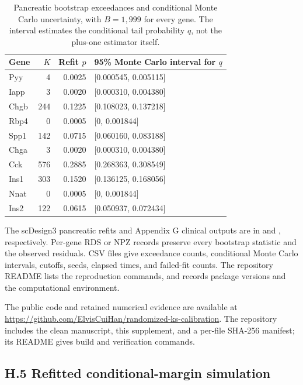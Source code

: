 \documentclass[12pt]{article}
\theoremstyle{remark}
\begin{document}
\begin{table}[htbp]
\centering
\small
\caption{Pancreatic bootstrap exceedances and conditional Monte Carlo
uncertainty, with $B=1,999$ for every gene. The interval estimates the
conditional tail probability $q$, not the plus-one estimator itself.}
\begin{tabular}{lrrl}
\hline
Gene & $K$ & Refit $p$ & 95\% Monte Carlo interval for $q$\\
\hline
Pyy  & 4   & 0.0025 & [0.000545, 0.005115]\\
Iapp & 3   & 0.0020 & [0.000310, 0.004380]\\
Chgb & 244 & 0.1225 & [0.108023, 0.137218]\\
Rbp4 & 0   & 0.0005 & [0, 0.001844]\\
Spp1 & 142 & 0.0715 & [0.060160, 0.083188]\\
Chga & 3   & 0.0020 & [0.000310, 0.004380]\\
Cck  & 576 & 0.2885 & [0.268363, 0.308549]\\
Ins1 & 303 & 0.1520 & [0.136125, 0.168056]\\
Nnat & 0   & 0.0005 & [0, 0.001844]\\
Ins2 & 122 & 0.0615 & [0.050937, 0.072434]\\
\hline
\end{tabular}
\end{table}

The scDesign3 pancreatic refits and Appendix G clinical outputs are in
 and ,
respectively. Per-gene RDS or NPZ records preserve every bootstrap statistic
and the observed residuals. CSV files give exceedance counts, conditional
Monte Carlo intervals, cutoffs, seeds, elapsed times, and failed-fit counts.
The repository README lists the reproduction commands, and
 records package versions and
the computational environment.

The public code and retained numerical evidence are available at
\url{https://github.com/ElvisCuiHan/randomized-ks-calibration}.
The repository includes the clean manuscript, this supplement, and a per-file
SHA-256 manifest; its README gives build and verification commands.

\subsection*{H.5 Refitted conditional-margin simulation}
\end{document}
